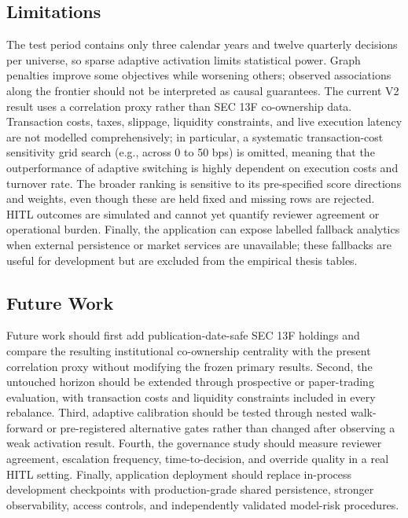\documentclass[11pt]{article}
\begin{document}
\subsection{Limitations}

The test period contains only three calendar years and twelve quarterly decisions per universe, so sparse adaptive activation limits statistical power. Graph penalties improve some objectives while worsening others; observed associations along the frontier should not be interpreted as causal guarantees. The current V2 result uses a correlation proxy rather than SEC 13F co-ownership data. Transaction costs, taxes, slippage, liquidity constraints, and live execution latency are not modelled comprehensively; in particular, a systematic transaction-cost sensitivity grid search (e.g., across 0 to 50 bps) is omitted, meaning that the outperformance of adaptive switching is highly dependent on execution costs and turnover rate. The broader ranking is sensitive to its pre-specified score directions and weights, even though these are held fixed and missing rows are rejected. HITL outcomes are simulated and cannot yet quantify reviewer agreement or operational burden. Finally, the application can expose labelled fallback analytics when external persistence or market services are unavailable; these fallbacks are useful for development but are excluded from the empirical thesis tables.

\subsection{Future Work}

Future work should first add publication-date-safe SEC 13F holdings and compare the resulting institutional co-ownership centrality with the present correlation proxy without modifying the frozen primary results. Second, the untouched horizon should be extended through prospective or paper-trading evaluation, with transaction costs and liquidity constraints included in every rebalance. Third, adaptive calibration should be tested through nested walk-forward or pre-registered alternative gates rather than changed after observing a weak activation result. Fourth, the governance study should measure reviewer agreement, escalation frequency, time-to-decision, and override quality in a real HITL setting. Finally, application deployment should replace in-process development checkpoints with production-grade shared persistence, stronger observability, access controls, and independently validated model-risk procedures.
\end{document}
